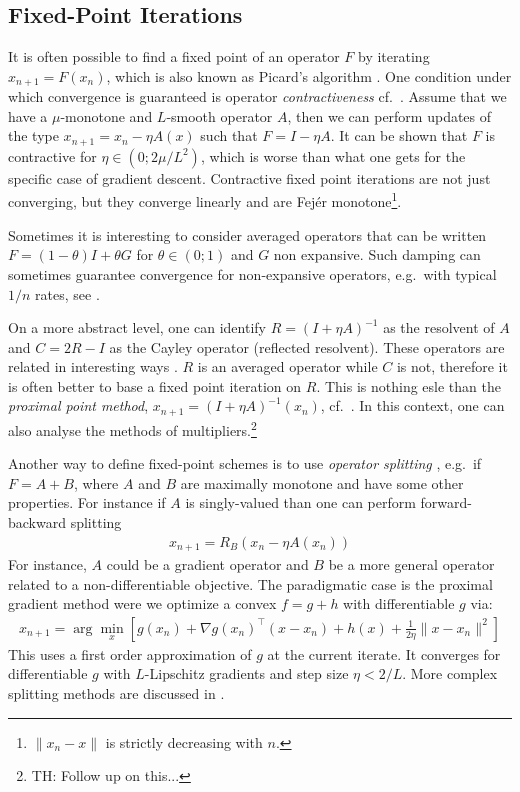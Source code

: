 \documentclass{article}
\begin{document}
\subsection{Fixed-Point Iterations}

It is often possible to find a fixed point of an operator $F$ by iterating $x_{n+1} = F(x_n)$, which is also known as Picard's algorithm \cite{picard1890memoire,banach1922operations}. One condition under which convergence is guaranteed is operator \textit{contractiveness} cf.~\cite[Section 5.1]{ryu2016primer}. Assume that we have a $\mu$-monotone and $L$-smooth operator $A$, then we can perform updates of the type $x_{n+1} = x_n - \eta A(x)$ such that $F = I - \eta A$. It can be shown that $F$ is contractive for $\eta \in (0; 2\mu/L^2)$, which is worse than what one gets for the specific case of gradient descent. Contractive fixed point iterations are not just converging, but they converge linearly and are Fej\'er monotone\footnote{$\| x_n -x\|$ is strictly decreasing with $n$.}. 

Sometimes it is interesting to consider averaged operators that can be written $F = (1-\theta)I + \theta G$ for $\theta \in (0;1)$ and $G$ non expansive. Such damping can sometimes guarantee convergence for non-expansive operators, e.g.~with typical $1/n$ rates, see \cite[Section 5.2]{ryu2016primer}.

On a more abstract level, one can identify $R=(I+\eta A)^{-1}$ as the resolvent of $A$ and $C = 2R -I$ as the Cayley operator (reflected resolvent). These operators are related in interesting ways \cite[Section 6.1]{ryu2016primer}. $R$ is an averaged operator while $C$ is not, therefore it is often better to base a fixed point iteration on $R$. This is nothing esle than the \textit{proximal point method}, $x_{n+1} = (I + \eta A)^{-1}(x_n)$, cf.~\cite{martinet1970breve,rockafellar1976monotone}. In this context, one can also analyse the methods of multipliers.\footnote{TH: Follow up on this...}

Another way to define fixed-point schemes is to use \textit{operator splitting} \cite[Section 7]{ryu2016primer}, e.g.~if $F = A+B$, where $A$ and $B$ are maximally monotone and have some other properties. For instance if $A$ is singly-valued than one can perform forward-backward splitting 
\begin{align}
x_{n+1} = R_B(x_{n} - \eta A(x_n))
\end{align}
For instance, $A$ could be a gradient operator and $B$ be a more general operator related to a non-differentiable objective. The paradigmatic case is the proximal gradient method \cite{combettes2005signal,duchi2009efficient,beck2009fast} were we optimize a convex $f=g+h$ with differentiable $g$ via:
\begin{align}
x_{n+1} = 	\arg\min_x \left[ 
g(x_n) + \nabla g(x_n)^\top (x-x_n)+ h(x) + \frac{1}{2\eta} \| x - x_n\|^2
\right] 
\end{align}
This uses a first order approximation of $g$ at the current iterate. It converges for differentiable $g$ with $L$-Lipschitz gradients and step size $\eta <2/L$. More complex splitting methods are discussed in \cite[Section 7.2-7.4]{ryu2016primer}.
\end{document}
